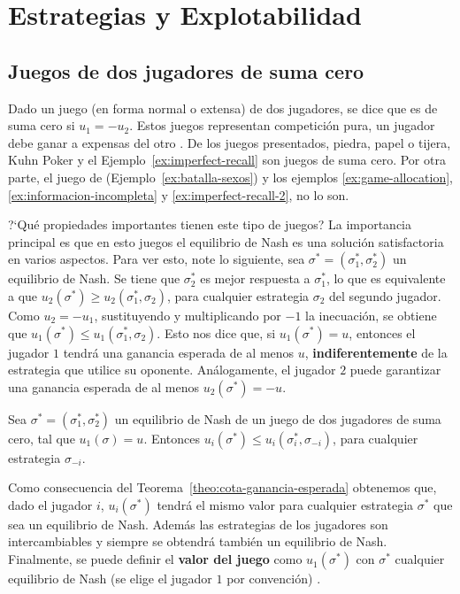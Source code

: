 \chapter{Estrategias y Explotabilidad}
\label{chapter:explotabilidad}

\section{Juegos de dos jugadores de suma cero}
\label{section:dos-jugadores-suma-cero}
Dado un juego (en forma normal o extensa) de dos jugadores, se dice que es de suma cero si $u_1 = -u_2$. Estos juegos representan competición pura, un jugador debe ganar a expensas del otro \cite[p.~5]{bib:handbook-blai}. De los juegos presentados, piedra, papel o tijera, Kuhn Poker y el Ejemplo~\ref{ex:imperfect-recall} son juegos de suma cero. Por otra parte, el juego de  (Ejemplo~\ref{ex:batalla-sexos}) y los  ejemplos \ref{ex:game-allocation}, \ref{ex:informacion-incompleta} y \ref{ex:imperfect-recall-2}, no lo son.

?`Qué propiedades importantes tienen este tipo de juegos? La importancia principal es que en esto juegos el equilibrio de Nash es una solución satisfactoria en varios aspectos. Para ver esto, note lo siguiente, sea $\sigma^* = (\sigma^*_1, \sigma^*_2)$ un equilibrio de Nash. Se tiene que $\sigma^*_2$ es mejor respuesta a $\sigma^*_1$, lo que es equivalente a que $u_2(\sigma^*) \geq u_2(\sigma^*_1, \sigma_2)$, para cualquier estrategia $\sigma_2$ del segundo jugador. Como $u_2 = -u_1$, sustituyendo y multiplicando por $-1$ la inecuación, se obtiene que $u_1(\sigma^*) \leq u_1(\sigma^*_1, \sigma_2)$. Esto nos dice que, si $u_1(\sigma^*) = u$, entonces el jugador $1$ tendrá una ganancia esperada de al menos $u$, \textbf{indiferentemente} de la estrategia que utilice su oponente. Análogamente, el jugador $2$ puede garantizar una ganancia esperada de al menos $u_2(\sigma^*) = -u$.

\begin{theorem}
\label{theo:cota-ganancia-esperada}
Sea $\sigma^* = (\sigma^*_1, \sigma^*_2)$ un equilibrio de Nash de un juego de dos jugadores de suma cero, tal que $u_1(\sigma) = u$. Entonces $u_i(\sigma^*) \leq u_i(\sigma^*_i, \sigma_{-i})$, para cualquier estrategia $\sigma_{-i}$.  
\end{theorem}

Como consecuencia del Teorema~\ref{theo:cota-ganancia-esperada} obtenemos que, dado el jugador $i$, $u_i(\sigma^*)$ tendrá el mismo valor para cualquier estrategia $\sigma^*$ que sea un equilibrio de Nash. Además las estrategias de los jugadores son intercambiables y siempre se obtendrá también un equilibrio de Nash. Finalmente, se puede definir el \textbf{valor del juego} como $u_1(\sigma^*)$ con $\sigma^*$ cualquier equilibrio de Nash (se elige el jugador $1$ por convención) \cite[p.~17]{bib:handbook-blai}.


